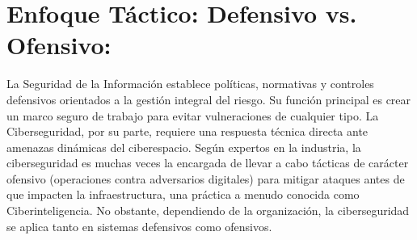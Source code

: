 \documentclass[letterpaper,11pt]{article}
\begin{document}
  \section{Enfoque Táctico: Defensivo vs. Ofensivo:}

  La Seguridad de la Información establece políticas, normativas y controles defensivos orientados a la gestión integral del riesgo. Su función principal es crear un marco seguro de trabajo para evitar vulneraciones de cualquier tipo.
  La Ciberseguridad, por su parte, requiere una respuesta técnica directa ante amenazas dinámicas del ciberespacio. Según expertos en la industria, la ciberseguridad es muchas veces la encargada de llevar a cabo tácticas de carácter ofensivo (operaciones contra adversarios digitales) para mitigar ataques antes de que impacten la infraestructura, una práctica a menudo conocida como Ciberinteligencia. No obstante, dependiendo de la organización, la ciberseguridad se aplica tanto en sistemas defensivos como ofensivos.


    \newpage

    \thispagestyle{empty}
    
    \nocite{*}
    \printbibliography[heading=bibintoc, title={Referencias}]
\end{document}
